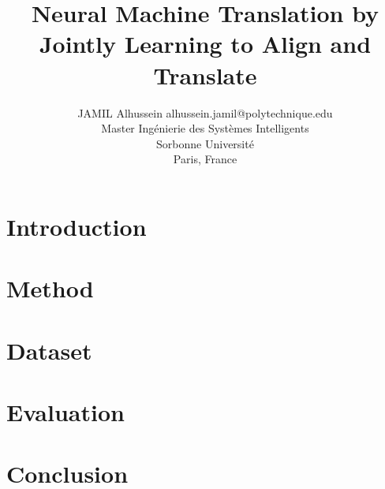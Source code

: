 \documentclass{article}
\begin{document}
\title{Neural Machine Translation by Jointly Learning to Align
and Translate}


\author{\name JAMIL Alhussein \email alhussein.jamil@polytechnique.edu \\
       \addr Master Ingénierie des Systèmes Intelligents \\
       Sorbonne Université\\
       Paris, France}
\maketitle



\section{Introduction}
\label{sec:intro}

\newpage
\section{Method}
\label{sec:methode}


\section{Dataset}
\label{sec:data}



\section{Evaluation}
\label{sec:experimence}


\section{Conclusion}
\label{sec:conclusion}







\end{document}
